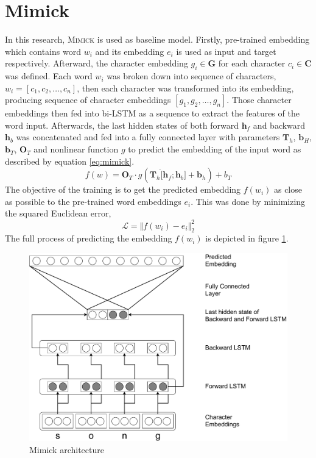 \section{Mimick}
    In this research, \textsc{Mimick} is used as baseline model.
    Firstly, pre-trained embedding which contains word $w_i$ and its
    embedding $e_i$ is used as input and target respectively.
    Afterward, the character embedding $g_i \in \mathbf{G}$ for each
    character $c_i \in \mathbf{C}$ was defined. Each word $w_i$ was
    broken down into sequence of characters, $w_i = [c_1,
    c_2, \dots, c_n]$, then each character was transformed into its
    embedding, producing sequence of character embeddings $[g_1, g_2,
    \dots, g_n]$. Those character embeddings then fed into bi-LSTM as
    a sequence to extract the features of the word input. Afterwards, the last
    hidden states of both forward $\mathbf{h}_f$ and backward
    $\mathbf{h}_b$ was concatenated and fed into a fully connected
    layer with parameters $\mathbf{T}_h$, $\mathbf{b}_H$,
    $\mathbf{b}_T$, $\mathbf{O}_T$ and nonlinear function $g$ to
    predict the embedding of the input word as described by equation
    \ref{eq:mimick}.
    \begin{equation}
        \label{eq:mimick}
        f(w) = \mathbf{O}_{T} \cdot g(\mathbf{T}_h \dot [\mathbf{h}_f;
        \mathbf{h}_b] + \mathbf{b}_h) + b_T
    \end{equation}
    The objective of the training is to get the predicted embedding
    $f(w_i)$ as close as possible to the pre-trained word embeddings $e_i$. This
    was done by minimizing the squared Euclidean error,
    \begin{equation}
        \label{eq:mimickloss}
        \mathcal{L} = \Vert f(w_i) - e_i \Vert_2^2
    \end{equation}
    The full process of predicting the embedding $f(w_i)$ is depicted
    in figure \ref{fig:mimick}.
    \begin{figure}
        \centering
        \includegraphics[width=.8\linewidth]{images/mimick.pdf}
        \caption{Mimick architecture}
        \label{fig:mimick}
    \end{figure}

